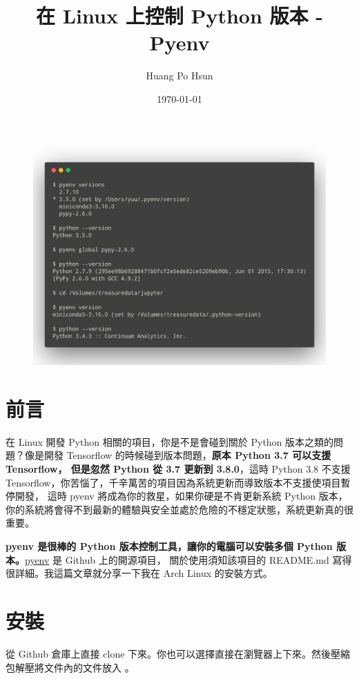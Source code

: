 \documentclass[12pt, a4paper]{article}
\author{Huang Po Hsun}
\date{\today}
\title{在 Linux 上控制 Python 版本 - Pyenv}
\begin{document}
\maketitle
\begin{figure}[H] %
    \centering %
    \includegraphics[width=1\textwidth]{terminal_output.png} %
\end{figure}
\newpage
\section{前言}
    在 Linux 開發 Python 相關的項目，你是不是會碰到關於 Python 版本之類的問題？像是開發 Tensorflow 的時候碰到版本問題，{\bf 原本 Python 3.7 可以支援 Tensorflow，
    但是忽然 Python 從 3.7 更新到 3.8.0}，這時 Python 3.8 不支援 Tensorflow，你苦惱了，千辛萬苦的項目因為系統更新而導致版本不支援使項目暫停開發，
    這時 pyenv 將成為你的救星，如果你硬是不肯更新系統 Python 版本，你的系統將會得不到最新的體驗與安全並處於危險的不穩定狀態，系統更新真的很重要。

    {\bf pyenv 是很棒的 Python 版本控制工具，讓你的電腦可以安裝多個 Python 版本。}\href{https://github.com/pyenv/pyenv}{pyenv} 是 Github 上的開源項目，
    關於使用須知該項目的 README.md 寫得很詳細。我這篇文章就分享一下我在 Arch Linux 的安裝方式。
\section{安裝}

    從 Github 倉庫上直接 clone 下來。你也可以選擇直接在瀏覽器上下來。然後壓縮包解壓將文件內的文件放入 {}。
\end{document}
